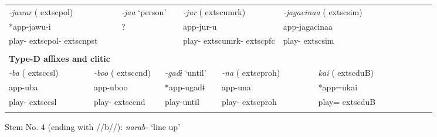 \begin{tabularx}{\textwidth}{XXXXXXXXXXXXXXXXXXXXXXX}
\multicolumn{3}{X}{{ \textit{{}-jawur} (	extsc{pol})}} & \multicolumn{3}{X}{{ \textit{{}-jaa} ‘person’}} & \multicolumn{5}{X}{{ \textit{{}-jur} (	extsc{umrk})}} & \multicolumn{4}{X}{{ \textit{{}-jagacinaa} (	extsc{sim})}} & \multicolumn{8}{X}{}\\
\multicolumn{3}{X}{{ *app-jawu-i}} & \multicolumn{3}{X}{?} & \multicolumn{5}{X}{app-jur-u} & \multicolumn{4}{X}{{ app-jagacinaa}} & \multicolumn{8}{X}{}\\
\multicolumn{3}{X}{play-	extsc{pol}-	extsc{npst}} & \multicolumn{3}{X}{} & \multicolumn{5}{X}{play-	extsc{umrk}-	extsc{pfc}} & \multicolumn{4}{X}{play-	extsc{sim}} & \multicolumn{8}{X}{}\\
\multicolumn{23}{X}{}\\
\multicolumn{23}{X}{{\bfseries Type-D affixes and clitic}}\\
\multicolumn{2}{X}{{ \textit{{}-ba} (	extsc{csl})}} & \multicolumn{3}{X}{{ \textit{{}-boo} (	extsc{cnd})}} & \multicolumn{3}{X}{{ \textit{{}-gadɨ} ‘until’}} & \multicolumn{4}{X}{{ \textit{{}-na} (	extsc{proh})}} & \multicolumn{5}{X}{{ \textit{kai} (	extsc{du}B)}} & \multicolumn{6}{X}{}\\
\multicolumn{2}{X}{{ app-uba}} & \multicolumn{3}{X}{{ app-uboo}} & \multicolumn{3}{X}{{ *app-ugadɨ}} & \multicolumn{4}{X}{{ app-una}} & \multicolumn{5}{X}{{ *app=ukai}} & \multicolumn{6}{X}{}\\
\multicolumn{2}{X}{play-	extsc{csl}} & \multicolumn{3}{X}{play-	extsc{cnd}} & \multicolumn{3}{X}{play-until} & \multicolumn{4}{X}{play-	extsc{proh}} & \multicolumn{5}{X}{play=	extsc{du}B} & \multicolumn{6}{X}{}\\
\lspbottomrule
\end{tabularx}
Stem No. 4 (ending with //b//): \textit{narab-} ‘line up’

\tablefirsthead{}

